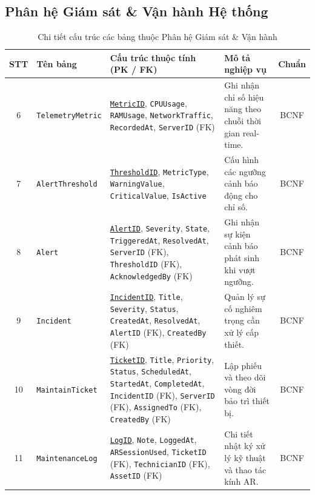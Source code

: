 \subsection{Phân hệ Giám sát \& Vận hành Hệ thống}

\begin{table}[H]
\centering
\caption{Chi tiết cấu trúc các bảng thuộc Phân hệ Giám sát \& Vận hành}
\label{tab:ph_giamsat}
\small
\begin{tabularx}{\textwidth}{|c|l|X|X|c|}
\hline
\textbf{STT} & \textbf{Tên bảng} & \textbf{Cấu trúc thuộc tính (PK / FK)} & \textbf{Mô tả nghiệp vụ} & \textbf{Chuẩn} \\ \hline
6 & \texttt{TelemetryMetric} & \underline{\texttt{MetricID}}, \texttt{CPUUsage}, \texttt{RAMUsage}, \texttt{NetworkTraffic}, \texttt{RecordedAt}, \texttt{ServerID} (FK) & Ghi nhận chỉ số hiệu năng theo chuỗi thời gian real-time. & BCNF \\ \hline
7 & \texttt{AlertThreshold} & \underline{\texttt{ThresholdID}}, \texttt{MetricType}, \texttt{WarningValue}, \texttt{CriticalValue}, \texttt{IsActive} & Cấu hình các ngưỡng cảnh báo động cho chỉ số. & BCNF \\ \hline
8 & \texttt{Alert} & \underline{\texttt{AlertID}}, \texttt{Severity}, \texttt{State}, \texttt{TriggeredAt}, \texttt{ResolvedAt}, \texttt{ServerID} (FK), \texttt{ThresholdID} (FK), \texttt{AcknowledgedBy} (FK) & Ghi nhận sự kiện cảnh báo phát sinh khi vượt ngưỡng. & BCNF \\ \hline
9 & \texttt{Incident} & \underline{\texttt{IncidentID}}, \texttt{Title}, \texttt{Severity}, \texttt{Status}, \texttt{CreatedAt}, \texttt{ResolvedAt}, \texttt{AlertID} (FK), \texttt{CreatedBy} (FK) & Quản lý sự cố nghiêm trọng cần xử lý cấp thiết. & BCNF \\ \hline
10 & \texttt{MaintainTicket} & \underline{\texttt{TicketID}}, \texttt{Title}, \texttt{Priority}, \texttt{Status}, \texttt{ScheduledAt}, \texttt{StartedAt}, \texttt{CompletedAt}, \texttt{IncidentID} (FK), \texttt{ServerID} (FK), \texttt{AssignedTo} (FK), \texttt{CreatedBy} (FK) & Lập phiếu và theo dõi vòng đời bảo trì thiết bị. & BCNF \\ \hline
11 & \texttt{MaintenanceLog} & \underline{\texttt{LogID}}, \texttt{Note}, \texttt{LoggedAt}, \texttt{ARSessionUsed}, \texttt{TicketID} (FK), \texttt{TechnicianID} (FK), \texttt{AssetID} (FK) & Chi tiết nhật ký xử lý kỹ thuật và thao tác kính AR. & BCNF \\ \hline
\end{tabularx}
\end{table}


